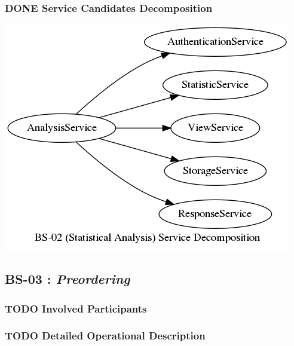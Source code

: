 \documentclass[11pt]{article}
\begin{document}
\subsubsection{{\bfseries\sffamily DONE} Service Candidates Decomposition}
\label{sec:org8953840}
\begin{center}
\includegraphics[width=.9\linewidth]{res/bs_02_dcmp.png}
\end{center}
\newpage
\subsection{\label{orgfa6460e}BS-03 : \emph{Preordering}}
\label{sec:org4afd8d2}
\subsubsection{{\bfseries\sffamily TODO} Involved Participants}
\label{sec:orgb05d243}
\subsubsection{{\bfseries\sffamily TODO} Detailed Operational Description}
\label{sec:org7e40423}
\end{document}

